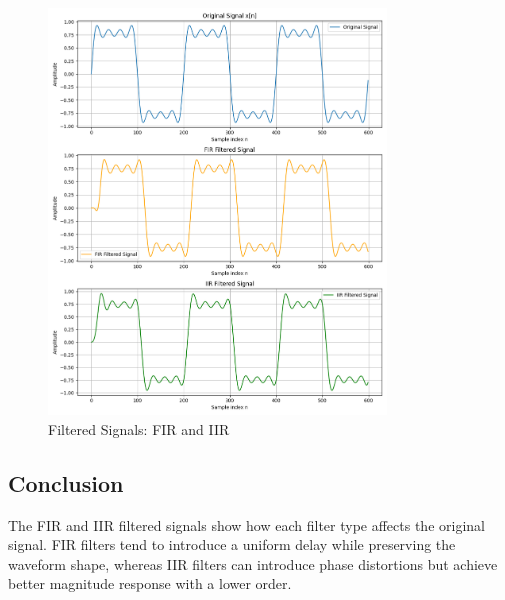 \begin{figure}[h]
    \centering
    \includegraphics[width=0.8\textwidth]{fig/ex1_filtered_signals.png}
    \caption{Filtered Signals: FIR and IIR}
    \label{fig:ex1_filtered_signals}
\end{figure}

\subsection*{Conclusion}
The FIR and IIR filtered signals show how each filter type affects the original signal. FIR filters tend to introduce a uniform delay while preserving the waveform shape, whereas IIR filters can introduce phase distortions but achieve better magnitude response with a lower order.
